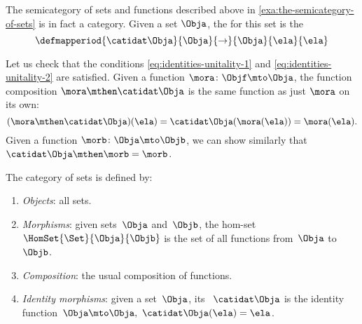 
\begin{example}
    \label{exa:the-category-of-sets}
    The semicategory of sets and functions described above in \cref{exa:the-semicategory-of-sets} is in fact a category.
    Given a set $\Obja$, the  for this set is the 
    \begin{equation}
        \defmapperiod{
            \catidat\Obja
        }{
            \Obja
        }{
            \to
        }{
            \Obja
        }{
            \ela
        }{
            \ela
        }
    \end{equation}

    Let us check that the conditions \cref{eq:identities-unitality-1} and \cref{eq:identities-unitality-2} are satisfied.
    Given a function $\mora \colon \Objf \mto \Obja$, the function composition $\mora \mthen \catidat\Obja$ is the same function as just $\mora$ on its own:
    \begin{equation}
        (\mora \mthen \catidat\Obja)(\ela)
        = \catidat\Obja(\mora (\ela)) = \mora (\ela).
    \end{equation}
    Given a function $\morb \colon \Obja \mto \Objb$, we can show similarly that $\catidat\Obja \mthen \morb = \morb$.
\end{example}

\begin{ctdefinition}
    \label{def:Set}
    The category \Set of sets is defined by:
    \begin{enumerate}
        \item \emph{Objects}: all sets.
        \item \emph{Morphisms}: given sets~$\Obja$ and~$\Objb$, the hom-set~$\HomSet{\Set}{\Obja}{\Objb}$ is the set of all functions from~$\Obja$ to~$\Objb$.
        \item \emph{Composition}: the usual composition of functions.
        \item \emph{Identity morphisms}: given a set~$\Obja$, its ~$\catidat\Obja$ is the identity function~$\Obja \mto \Obja, \ \catidat\Obja(\ela) = \ela$.
    \end{enumerate}
\end{ctdefinition}

